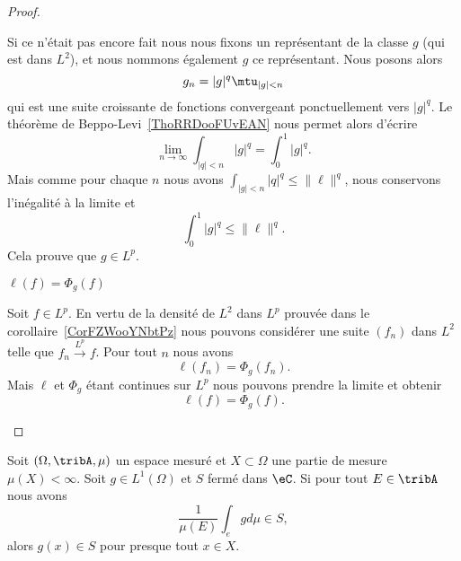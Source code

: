 \begin{proof}
\begin{subproof}
\begin{subproof}
                    Si ce n'était pas encore fait nous nous fixons un représentant de la classe \( g\) (qui est dans \( L^2\)), et nous nommons également \( g\) ce représentant. Nous posons alors
                    \begin{equation}
                        g_n=| g |^q\mtu_{| g |<n}
                    \end{equation}
                    qui est une suite croissante de fonctions convergeant ponctuellement vers \( | g |^q\). Le théorème de Beppo-Levi~\ref{ThoRRDooFUvEAN} nous permet alors d'écrire
                    \begin{equation}
                        \lim_{n\to \infty} \int_{| q |<n}| g |^q=\int_{0}^1| g |^q.
                    \end{equation}
                    Mais comme pour chaque \( n\) nous avons \( \int_{| g |<n}| q |^q\leq \| \ell \|^q\), nous conservons l'inégalité à la limite et
                    \begin{equation}
                        \int_0^1| g |^q\leq \| \ell \|^q.
                    \end{equation}
                    Cela prouve que \( g\in L^p\).

                \item[\( \ell(f)=\Phi_g(f)\)]

                    Soit \( f\in L^p\). En vertu de la densité de \( L^2\) dans \( L^p\) prouvée dans le corollaire~\ref{CorFZWooYNbtPz} nous pouvons considérer une suite \( (f_n)\) dans \( L^2\) telle que \( f_n\stackrel{L^p}{\longrightarrow}f\). Pour tout \( n\) nous avons
                    \begin{equation}
                        \ell(f_n)=\Phi_g(f_n).
                    \end{equation}
                    Mais \( \ell\) et \( \Phi_g\) étant continues sur \( L^p\) nous pouvons prendre la limite et obtenir
                    \begin{equation}
                        \ell(f)=\Phi_g(f).
                    \end{equation}
            \end{subproof}
        \end{subproof}
\end{proof}

\begin{lemma} \label{LemHNPEooHtMOGY}
    Soit \( (\Omega,\tribA,\mu)\) un espace mesuré et \( X\subset \Omega\) une partie de mesure \( \mu(X)<\infty\). Soit \( g\in L^1(\Omega)\) et \( S\) fermé dans \( \eC\). Si pour tout \( E\in \tribA\) nous avons
    \begin{equation}
        \frac{1}{ \mu(E) }\int_egd\mu\in S,
    \end{equation}
    alors \( g(x)\in S\) pour presque tout \( x\in X\).
\end{lemma}


